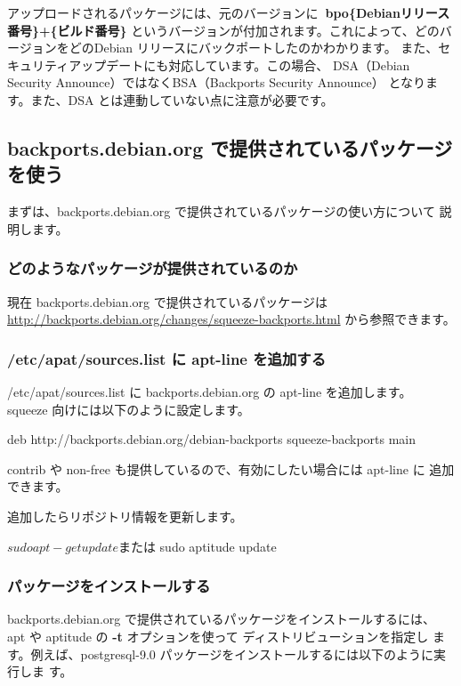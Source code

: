 \documentclass[mingoth,a4paper]{jsarticle}
\begin{document}
アップロードされるパッケージには、元のバージョンに{\bf{~{}bpo\{Debianリリース番号\}+\{ビルド番号\}}}
というバージョンが付加されます。これによって、どのバージョンをどのDebian
リリースにバックポートしたのかわかります。
また、セキュリティアップデートにも対応しています。この場合、
DSA（Debian Security Announce）ではなくBSA（Backports Security Announce）
となります。また、DSA とは連動していない点に注意が必要です。


\subsection{backports.debian.org で提供されているパッケージを使う}

まずは、backports.debian.org で提供されているパッケージの使い方について
説明します。

\subsubsection{どのようなパッケージが提供されているのか}
現在 backports.debian.org で提供されているパッケージは
\url{http://backports.debian.org/changes/squeeze-backports.html}
から参照できます。

\subsubsection{/etc/apat/sources.list に apt-line を追加する}

/etc/apat/sources.list に backports.debian.org の apt-line を追加します。
squeeze 向けには以下のように設定します。
\begin{commandline}
deb http://backports.debian.org/debian-backports squeeze-backports main
\end{commandline}

contrib や non-free も提供しているので、有効にしたい場合には apt-line に
追加できます。

追加したらリポジトリ情報を更新します。

\begin{commandline}
$ sudo apt-get update
または
$ sudo aptitude update
\end{commandline}

\subsubsection{パッケージをインストールする}

backports.debian.org で提供されているパッケージをインストールするには、
apt や aptitude の {\bf{-t}} オプションを使って ディストリビューションを指定し
ます。例えば、postgresql-9.0 パッケージをインストールするには以下のように実行しま
す。
\end{document}
